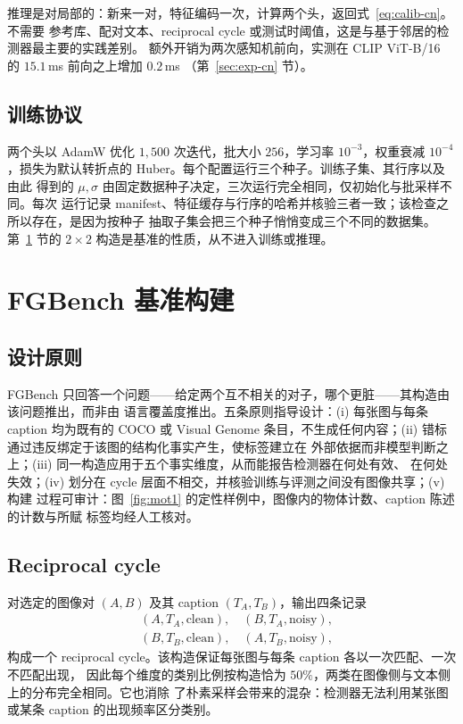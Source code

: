\documentclass[10pt,twocolumn,a4paper]{ctexart}
\begin{document}
推理是对局部的：新来一对，特征编码一次，计算两个头，返回式~\eqref{eq:calib-cn}。不需要
参考库、配对文本、reciprocal cycle 或测试时阈值，这是与基于邻居的检测器最主要的实践差别。
额外开销为两次感知机前向，实测在 CLIP ViT-B/16 的 $15.1$\,ms 前向之上增加 $0.2$\,ms
（第~\ref{sec:exp-cn} 节）。

\subsection{训练协议}
两个头以 AdamW 优化 $1{,}500$ 次迭代，批大小 $256$，学习率 $10^{-3}$，权重衰减
$10^{-4}$，损失为默认转折点的 Huber。每个配置运行三个种子。训练子集、其行序以及由此
得到的 $\mu,\sigma$ 由固定数据种子决定，三次运行完全相同，仅初始化与批采样不同。每次
运行记录 manifest、特征缓存与行序的哈希并核验三者一致；该检查之所以存在，是因为按种子
抽取子集会把三个种子悄悄变成三个不同的数据集。第~\ref{sec:fgbench-cn} 节的 $2\times2$
构造是基准的性质，从不进入训练或推理。

\section{FGBench 基准构建}
\label{sec:fgbench-cn}

\subsection{设计原则}
FGBench 只回答一个问题——给定两个互不相关的对子，哪个更脏——其构造由该问题推出，而非由
语言覆盖度推出。五条原则指导设计：(i) 每张图与每条 caption 均为既有的 COCO 或 Visual
Genome 条目，不生成任何内容；(ii) 错标通过违反绑定于该图的结构化事实产生，使标签建立在
外部依据而非模型判断之上；(iii) 同一构造应用于五个事实维度，从而能报告检测器在何处有效、
在何处失效；(iv) 划分在 cycle 层面不相交，并核验训练与评测之间没有图像共享；(v) 构建
过程可审计：图~\ref{fig:mot1} 的定性样例中，图像内的物体计数、caption 陈述的计数与所赋
标签均经人工核对。

\subsection{Reciprocal cycle}
对选定的图像对 $(A,B)$ 及其 caption $(T_A,T_B)$，输出四条记录
\begin{equation}
\begin{aligned}
  &(A,T_A,\text{clean}),\quad (B,T_A,\text{noisy}),\\
  &(B,T_B,\text{clean}),\quad (A,T_B,\text{noisy}),
\end{aligned}
\end{equation}
构成一个 reciprocal cycle。该构造保证每张图与每条 caption 各以一次匹配、一次不匹配出现，
因此每个维度的类别比例按构造恰为 $50\%$，两类在图像侧与文本侧上的分布完全相同。它也消除
了朴素采样会带来的混杂：检测器无法利用某张图或某条 caption 的出现频率区分类别。
\end{document}
